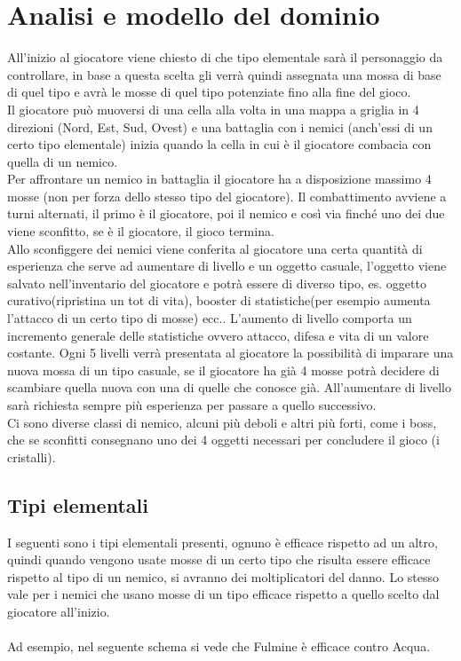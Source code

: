 \documentclass[a4paper,12pt]{report}
\begin{document}
\section{Analisi e modello del dominio}

All'inizio al giocatore viene chiesto di che tipo elementale sarà il personaggio da controllare, in base a questa scelta gli verrà quindi assegnata una mossa di base di quel tipo e avrà le mosse di quel tipo potenziate fino alla fine del gioco.\\
Il giocatore può muoversi di una cella alla volta in una mappa a griglia in 4 direzioni (Nord, Est, Sud, Ovest) e una battaglia con i nemici (anch'essi di un certo tipo elementale) inizia quando la cella in cui è il giocatore combacia con quella di un nemico.\\
Per affrontare un nemico in battaglia il giocatore ha a disposizione massimo 4 mosse (non per forza dello stesso tipo del giocatore). Il combattimento avviene a turni alternati, il primo è il giocatore, poi il nemico e così via finché uno dei due viene sconfitto, se è il giocatore, il gioco termina.\\
Allo sconfiggere dei nemici viene conferita al giocatore una certa quantità di esperienza che serve ad aumentare di livello e un oggetto casuale, l'oggetto viene salvato nell'inventario del giocatore e potrà essere di diverso tipo, es. oggetto curativo(ripristina un tot di vita), booster di statistiche(per esempio aumenta l'attacco di un certo tipo di mosse) ecc.. L'aumento di livello comporta un incremento generale delle statistiche ovvero attacco, difesa e vita di un valore costante. Ogni 5 livelli verrà presentata al giocatore la possibilità di imparare una nuova mossa di un tipo casuale, se il giocatore ha già 4 mosse potrà decidere di scambiare quella nuova con una di quelle che conosce già. All'aumentare di livello sarà richiesta sempre più esperienza per passare a quello successivo.\\
Ci sono diverse classi di nemico, alcuni più deboli e altri più forti, come i boss, che se sconfitti consegnano uno dei 4 oggetti necessari per concludere il gioco (i cristalli).\\

\subsection{Tipi elementali}
I seguenti sono i tipi elementali presenti, ognuno è efficace rispetto ad un altro, quindi quando vengono usate mosse di un certo tipo che risulta essere efficace rispetto al tipo di un nemico, si avranno dei moltiplicatori del danno. Lo stesso vale per i nemici che usano mosse di un tipo efficace rispetto a quello scelto dal giocatore all'inizio.
\\\\
Ad esempio, nel seguente schema si vede che Fulmine è efficace contro Acqua.
\end{document}
